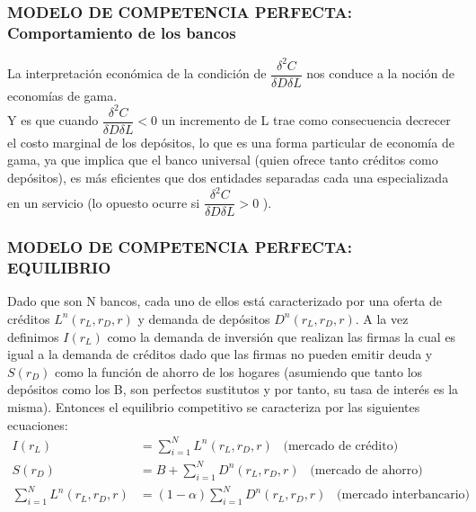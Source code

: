 \documentclass[10pt, xcolor=table, x11names]{beamer}
\begin{document}
\begin{frame}
    \frametitle{{\normalsize MODELO DE COMPETENCIA PERFECTA: Comportamiento de los bancos} {}}
    La interpretación económica de la condición de $\dfrac{\delta^{2}C}{\delta D \delta L}$ nos conduce a la noción de economías de gama. \\
    Y es que cuando $\dfrac{\delta^{2}C}{\delta D \delta L}<0$ un incremento de L trae como consecuencia decrecer el costo marginal de los depósitos, lo que es una forma particular de economía de gama, ya que implica que el banco universal (quien ofrece tanto créditos como depósitos), es más eficientes que dos entidades separadas cada una especializada en un servicio (lo opuesto ocurre si $\dfrac{\delta^{2}C}{\delta D \delta L}>0 $ ).
\end{frame}

\begin{frame}
    \frametitle{{\normalsize MODELO DE COMPETENCIA PERFECTA: EQUILIBRIO} {}}
    Dado que son N bancos, cada uno de ellos está caracterizado por una oferta de créditos $L^{n}(r_{L}, r_{D}, r)$ y demanda de depósitos $D^{n}(r_{L}, r_{D}, r)$. A la vez  definimos $I(r_{L})$ como la demanda de inversión que realizan las firmas la cual es igual a la demanda de créditos dado que las firmas no pueden emitir deuda y $S(r_{D}) $ como la función de ahorro de los hogares (asumiendo que tanto los depósitos como los B, son perfectos sustitutos y por tanto, su tasa de interés es la misma). Entonces el equilibrio competitivo se caracteriza por las siguientes ecuaciones:
     \begin{align}
     I(r_{L})&=\sum_{i=1}^{N}L^{n}(r_{L}, r_{D}, r) \;\;\; \mbox{(mercado de crédito)}\\
     S(r_{D})&=B+\sum_{i=1}^{N}D^{n}(r_{L}, r_{D}, r) \;\;\; \mbox{(mercado de ahorro)}\\
     \sum_{i=1}^{N}L^{n}(r_{L}, r_{D}, r)&=(1-\alpha)\sum_{i=1}^{N}D^{n}(r_{L}, r_{D}, r) \;\;\; \mbox{(mercado interbancario)}
     \end{align} 
    
    
    
\end{frame}
\end{document}
